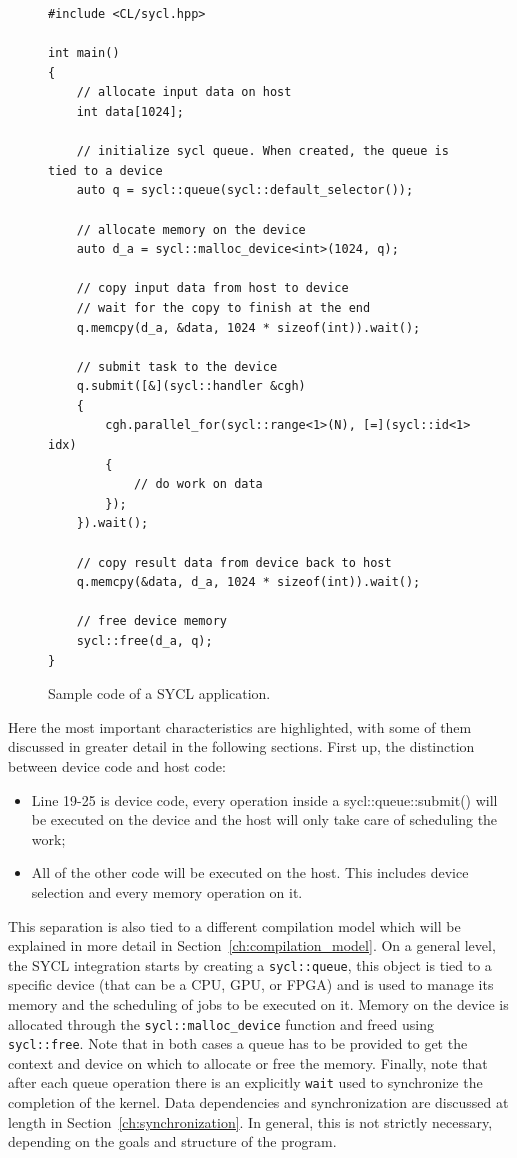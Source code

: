 \begin{figure}[ht!]
\renewcommand{\figurename}{Code}
\begin{verbatim}
#include <CL/sycl.hpp>

int main()
{
    // allocate input data on host
    int data[1024];
    
    // initialize sycl queue. When created, the queue is tied to a device
    auto q = sycl::queue(sycl::default_selector());
    
    // allocate memory on the device
    auto d_a = sycl::malloc_device<int>(1024, q);
    
    // copy input data from host to device
    // wait for the copy to finish at the end
    q.memcpy(d_a, &data, 1024 * sizeof(int)).wait();

    // submit task to the device
    q.submit([&](sycl::handler &cgh)
    {
        cgh.parallel_for(sycl::range<1>(N), [=](sycl::id<1> idx)
        {
            // do work on data
        });
    }).wait();
    
    // copy result data from device back to host
    q.memcpy(&data, d_a, 1024 * sizeof(int)).wait();
    
    // free device memory
    sycl::free(d_a, q);
}
\end{verbatim}
\caption{Sample code of a SYCL application.}
\label{code:simple_ex}
\end{figure}

Here the most important characteristics are highlighted, with some of them discussed in greater detail in the following sections. First up, the distinction between device code and host code: 
\begin{itemize}
    \item Line 19-25 is device code, every operation inside a sycl::queue::submit() will be executed on the device and the host will only take care of scheduling the work;
    \item All of the other code will be executed on the host. This includes device selection and every memory operation on it.
\end{itemize}
This separation is also tied to a different compilation model which will be explained in more detail in Section~\ref{ch:compilation_model}. On a general level, the SYCL integration starts by creating a \texttt{sycl::queue}, this object is tied to a specific device (that can be a CPU, GPU, or FPGA) and is used to manage its memory and the scheduling of jobs to be executed on it. Memory on the device is allocated through the \texttt{sycl::malloc\_device} function and freed using \texttt{sycl::free}. Note that in both cases a queue has to be provided to get the context and device on which to allocate or free the memory. Finally, note that after each queue operation there is an explicitly \texttt{wait} used to synchronize the completion of the kernel. Data dependencies and synchronization are discussed at length in Section~\ref{ch:synchronization}. In general, this is not strictly necessary, depending on the goals and structure of the program.

